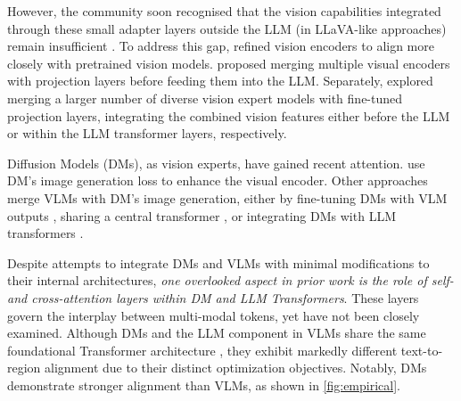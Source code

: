 However, the community soon recognised that the vision capabilities integrated through these small adapter layers outside the LLM (in LLaVA-like approaches) remain insufficient \cite{tong2024eyes}. To address this gap, \citet{covert2024locality, karamcheti2024prismatic} refined vision encoders to align more closely with pretrained vision models.  
\citet{jiang2023clip, kar2025brave} proposed merging multiple visual encoders with projection layers before feeding them into the LLM.  
Separately, \citet{tong2024cambrian, shi2024eagle, zong2024mova} explored merging a larger number of diverse vision expert models with fine-tuned projection layers, integrating the combined vision features either before the LLM or within the LLM transformer layers, respectively.  

Diffusion Models (DMs), as vision experts, have gained recent attention. \citet{wang2024diffusion} use DM’s image generation loss to enhance the visual encoder. Other approaches merge VLMs with DM’s image generation, either by fine-tuning DMs with VLM outputs \cite{tong2024metamorph, hernandez2024generative}, sharing a central transformer \cite{shi2025lmfusionadaptingpretrainedlanguage, chen2025janusprounifiedmultimodalunderstanding}, or integrating DMs with LLM transformers \cite{zhou2024transfusion}.

Despite attempts to integrate DMs and VLMs with minimal modifications to their internal architectures, \emph{one overlooked aspect in prior work is the role of self- and cross-attention layers within DM and LLM Transformers}. These layers govern the interplay between multi-modal tokens, yet have not been closely examined. Although DMs and the LLM component in VLMs share the same foundational Transformer architecture \cite{vaswani2017attention, dosovitskiy2020image}, they exhibit markedly different text-to-region alignment due to their distinct optimization objectives. Notably, DMs demonstrate stronger alignment than VLMs, as shown in \cref{fig:empirical}.